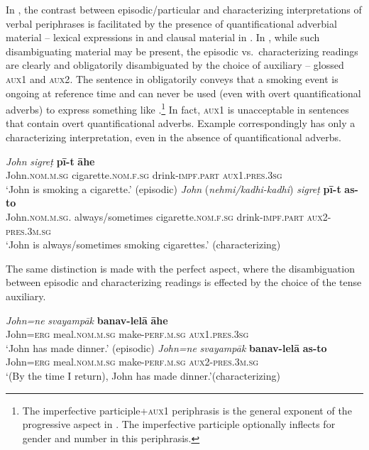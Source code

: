 \documentclass[output=paper,hidelinks]{langscibook}
\begin{document}
In , the contrast between episodic/particular and characterizing interpretations of verbal periphrases is facilitated by the presence of quantificational adverbial material -- lexical expressions in  and clausal material in . In , while such disambiguating material may be present, the episodic vs.\ characterizing readings are clearly and obligatorily disambiguated by the choice of auxiliary -- glossed \textsc{aux1} and \textsc{aux2}.
The sentence in  obligatorily conveys that a smoking event is ongoing at reference time and can never be used (even with overt quantificational adverbs) to express something like .\footnote{The imperfective participle+\textsc{aux1} periphrasis is the general exponent of the progressive aspect in . The imperfective participle optionally inflects for gender and number in this periphrasis.} In fact, \textsc{aux1} is unacceptable in sentences that contain overt quantificational adverbs. Example  correspondingly has only a characterizing interpretation, even in the absence of quantificational adverbs.
 
\ea \label{marcontrast}
\ea
\gll \emph{John} \emph{sigreṭ} \textbf{pī-t} \textbf{āhe}\\
John.\textsc{nom.m.sg} cigarette.\textsc{nom.f.sg} drink-\textsc{impf.part} \textsc{aux1.pres.3sg}\\
\glt
`John is smoking a cigarette.' \hfill{(episodic)} \label{marcontrasta}
\ex
\gll \emph{John} (\emph{nehmi/kadhi-kadhi}) \emph{sigreṭ} \textbf{pī-t} \textbf{as-to}\\
John.\textsc{nom.m.sg.} always/sometimes cigarette.\textsc{nom.f.sg} drink-\textsc{impf.part} \textsc{aux2-pres.3m.sg}\\
\glt `John is always/sometimes smoking cigarettes.' \hfill{(characterizing)} \label{marcontrastb}
\z
\z

The same distinction is made with the perfect aspect, where the disambiguation between episodic and characterizing readings is effected by the choice of the tense auxiliary.\largerpage

 \ea \label{marcontrast2}
\ea
\gll \emph{John=ne} \emph{svayampāk} \textbf{banav-lelā} \textbf{āhe}\\
 John=\textsc{erg} meal.\textsc{nom.m.sg} make-\textsc{perf.m.sg} \textsc{aux1.pres.3sg}\\
\glt `John has made dinner.' \hfill{(episodic)}\label{marcontrast-c}
\ex
\gll \emph{John=ne} \emph{svayampāk} \textbf{banav-lelā} \textbf{as-to}\\
 John=\textsc{erg} meal.\textsc{nom.m.sg} make-\textsc{perf.m.sg} \textsc{aux2-pres.3m.sg}\\
\glt `(By the time I return), John has made dinner.'\hfill{(characterizing)} \label{marcontrast-d}
\z
\z
\end{document}
